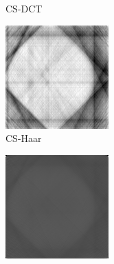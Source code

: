 \documentclass[journal]{IEEEtran}
\begin{document}
\begin{figure}[!h]
\begin{subfigure}[b]{0.24\linewidth}
        \caption{CS-DCT}
     \end{subfigure}
    \begin{subfigure}[b]{0.24\linewidth}
        \includegraphics[width=\textwidth]{../images/potato/post_tci/comparison/cs_wavelet.png}
        \caption{CS-Haar}
     \end{subfigure}
    \begin{subfigure}[b]{0.24\linewidth}
        \includegraphics[width=\textwidth]{../images/potato/post_tci/comparison/art.png}

\end{subfigure}
\end{figure}
\end{document}
